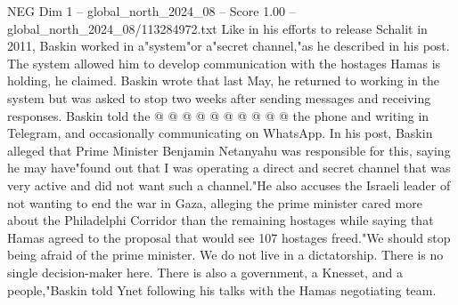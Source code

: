 \begin{textsample}{NEG Dim 1 – global\_north\_2024\_08 – Score 1.00 – global\_north\_2024\_08/113284972.txt}
Like in his efforts to release Schalit in 2011, Baskin worked in a"system"or a"secret channel,"as he described in his post.
The system allowed him to develop communication with the hostages Hamas is holding, he claimed.
Baskin wrote that last May, he returned to working in the system but was asked to stop two weeks after sending messages and receiving responses.
Baskin told the @ @ @ @ @ @ @ @ @ @ the phone and writing in Telegram, and occasionally communicating on WhatsApp.
In his post, Baskin alleged that Prime Minister Benjamin Netanyahu was responsible for this, saying he may have"found out that I was operating a direct and secret channel that was very active and did not want such a channel."He also accuses the Israeli leader of not wanting to end the war in Gaza, alleging the prime minister cared more about the Philadelphi Corridor than the remaining hostages while saying that Hamas agreed to the proposal that would see 107 hostages freed."We should stop being afraid of the prime minister.
We do not live in a dictatorship.
There is no single decision-maker here.
There is also a government, a Knesset, and a people,"Baskin told Ynet following his talks with the Hamas negotiating team.

\end{textsample}
